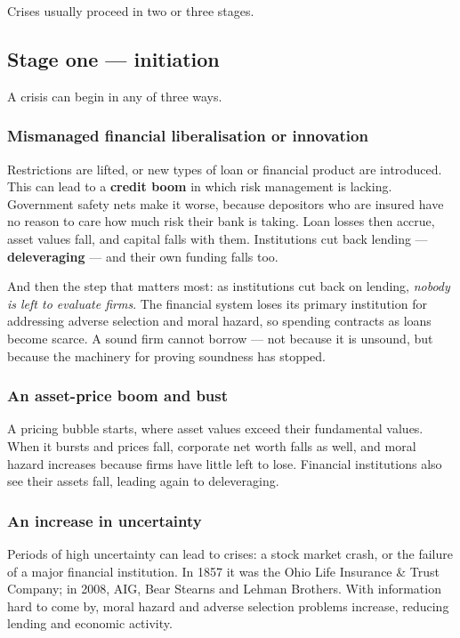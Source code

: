 \documentclass[11pt,a4paper]{article}
\begin{document}
Crises usually proceed in two or three stages.

\subsection*{Stage one --- initiation}

A crisis can begin in any of three ways.

\subsubsection*{Mismanaged financial liberalisation or innovation}
Restrictions are lifted, or new types of loan or financial product are
introduced. This can lead to a \textbf{credit boom} in which risk management is
lacking. Government safety nets make it worse, because depositors who are
insured have no reason to care how much risk their bank is taking. Loan losses
then accrue, asset values fall, and capital falls with them. Institutions cut
back lending --- \textbf{deleveraging} --- and their own funding falls too.

And then the step that matters most: as institutions cut back on lending,
\emph{nobody is left to evaluate firms}. The financial system loses its primary
institution for addressing adverse selection and moral hazard, so spending
contracts as loans become scarce. A sound firm cannot borrow --- not because it
is unsound, but because the machinery for proving soundness has stopped.

\subsubsection*{An asset-price boom and bust}
A pricing bubble starts, where asset values exceed their fundamental values.
When it bursts and prices fall, corporate net worth falls as well, and moral
hazard increases because firms have little left to lose. Financial institutions
also see their assets fall, leading again to deleveraging.

\subsubsection*{An increase in uncertainty}
Periods of high uncertainty can lead to crises: a stock market crash, or the
failure of a major financial institution. In 1857 it was the Ohio Life Insurance
\& Trust Company; in 2008, AIG, Bear Stearns and Lehman Brothers. With
information hard to come by, moral hazard and adverse selection problems
increase, reducing lending and economic activity.
\end{document}
